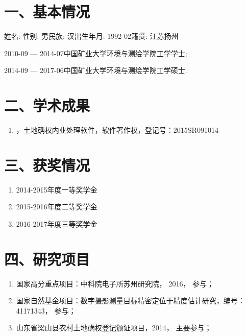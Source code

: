 \begin{resume}

\section*{一、基本情况}


姓名: \zuozhe\quad 性别: 男\quad 民族: 汉\quad 出生年月: 1992-02\quad 籍贯: 江苏扬州

2010-09 --- 2014-07\quad  中国矿业大学环境与测绘学院工学学士;

2014-09 --- 2017-06\quad  中国矿业大学环境与测绘学院工学硕士.

\section*{二、学术成果}

\begin{enumerate}
  \item \zuozhe，土地确权内业处理软件，软件著作权，登记号：2015SR091014
\end{enumerate}


\section*{三、获奖情况}
\begin{enumerate}
  \item 2014-2015年度\quad 一等奖学金
  \item 2015-2016年度\quad 二等奖学金
  \item 2016-2017年度\quad 三等奖学金
\end{enumerate}
\section*{四、研究项目}
\begin{enumerate}
  \item 国家高分重点项目：中科院电子所苏州研究院， 2016， 参与；
  \item 国家自然基金项目：数字摄影测量目标精密定位于精度估计研究，编号：41171343， 参与；
  \item 山东省梁山县农村土地确权登记颁证项目，2014， 主要参与；
\end{enumerate}

\end{resume}